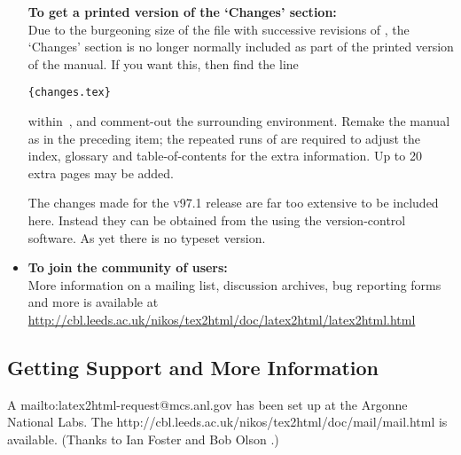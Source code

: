 \begin{itemize}
\begin{changebar}
\textbf{To get a printed version of the `Changes' section: }\\
Due to the burgeoning size of the  file with successive
revisions of \latextohtml, the `Changes' section is no longer
normally included as part of the printed version of the manual.
If you want this, then find the line \html{\smallskip}
\begin{small}
\verb|{changes.tex}|
\end{small}
\html{\smallskip}
within \,,
and comment-out the surrounding  environment.
Remake the manual as in the preceding item;
the repeated runs of  are required to adjust the index,
glossary and table-of-contents for the extra information.
Up to 20 extra pages may be added.%
\begin{changebar}%
The changes made for the \textsc{v97.1} release are far too extensive
to be included here. Instead they can be obtained from the
%
using the  version-control software.
As yet there is no typeset version.
\end{changebar}\end{changebar}


%
\item
\textbf{To join the community of \latextohtml{} users:} \\
More information on a mailing list, discussion archives, bug reporting
forms and more is available at
\url{http://cbl.leeds.ac.uk/nikos/tex2html/doc/latex2html/latex2html.html}
\end{itemize}


\subsection[center]{Getting Support and More Information\label{support}}%
%

A %
{mailto:latex2html-request@mcs.anl.gov}
has been set up at the Argonne National Labs.
The %
{http://cbl.leeds.ac.uk/nikos/tex2html/doc/mail/mail.html} is available.
\html{\\}
(Thanks to Ian Foster 
and Bob Olson .)

